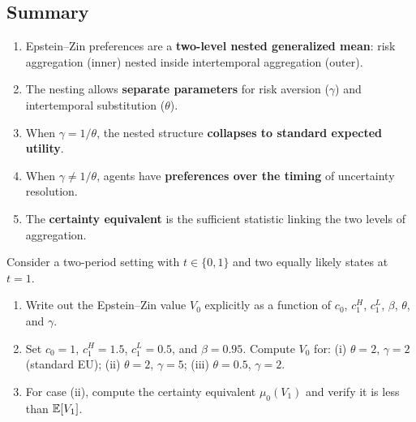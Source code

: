 \subsection{Summary}
\label{subsec:ez-summary}

\begin{calloutimportant}
\begin{enumerate}[label=(\roman*), leftmargin=2em]
    \item Epstein--Zin preferences are a \textbf{two-level nested generalized mean}: risk aggregation (inner) nested inside intertemporal aggregation (outer).
    
    \item The nesting allows \textbf{separate parameters} for risk aversion ($\gamma$) and intertemporal substitution ($\theta$).
    
    \item When $\gamma = 1/\theta$, the nested structure \textbf{collapses to standard expected utility}.
    
    \item When $\gamma \neq 1/\theta$, agents have \textbf{preferences over the timing} of uncertainty resolution.
    
    \item The \textbf{certainty equivalent} is the sufficient statistic linking the two levels of aggregation.
\end{enumerate}
\end{calloutimportant}

\begin{callouttip}[Exercise]
Consider a two-period setting with $t \in \{0, 1\}$ and two equally likely states at $t=1$.
\begin{enumerate}[label=(\alph*), leftmargin=1.5em]
    \item Write out the Epstein--Zin value $V_0$ explicitly as a function of $c_0$, $c_1^H$, $c_1^L$, $\beta$, $\theta$, and $\gamma$.
    \item Set $c_0 = 1$, $c_1^H = 1.5$, $c_1^L = 0.5$, and $\beta = 0.95$. Compute $V_0$ for: (i) $\theta = 2$, $\gamma = 2$ (standard EU); (ii) $\theta = 2$, $\gamma = 5$; (iii) $\theta = 0.5$, $\gamma = 2$.
    \item For case (ii), compute the certainty equivalent $\mu_0(V_1)$ and verify it is less than $\mathbb{E}[V_1]$.
\end{enumerate}
\end{callouttip}
